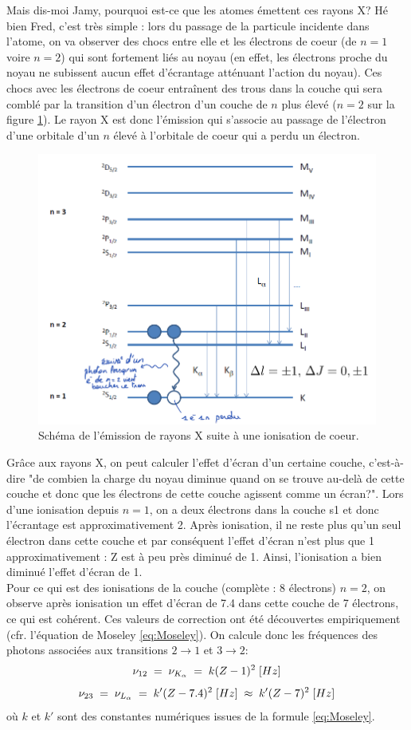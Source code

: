 Mais dis-moi Jamy, pourquoi est-ce que les atomes émettent ces rayons X? Hé bien Fred, c'est très simple : lors du passage de la particule incidente dans l'atome, on va observer des chocs entre elle et les électrons de coeur (de $n=1$ voire $n=2$) qui sont fortement liés au noyau (en effet, les électrons proche du noyau ne subissent aucun effet d'écrantage atténuant l'action du noyau). Ces chocs avec les électrons de coeur entraînent des trous dans la couche qui sera comblé par la transition d'un électron d'un couche de $n$ plus élevé ($n=2$ sur la figure \ref{fig:Rayons X}). Le rayon X est donc l'émission qui s'associe au passage de l'électron d'une orbitale d'un $n$ élevé à l'orbitale de coeur qui a perdu un électron.
\begin{figure}[tph]
    \centering
    \includegraphics[scale=0.8]{Images2/Rayons X.PNG}
    \caption{Schéma de l'émission de rayons X suite à une ionisation de coeur.}
    \label{fig:Rayons X}
\end{figure}
Grâce aux rayons X, on peut calculer l'effet d'écran d'un certaine couche, c'est-à-dire "de combien la charge du noyau diminue quand on se trouve au-delà de cette couche et donc que les électrons de cette couche agissent comme un écran?". Lors d'une ionisation depuis $n=1$, on a deux électrons dans la couche s1 et donc l'écrantage est approximativement 2. Après ionisation, il ne reste plus qu'un seul électron dans cette couche et par conséquent l'effet d'écran n'est plus que 1 approximativement : Z est à peu près diminué de 1. Ainsi, l'ionisation a bien diminué l'effet d'écran de 1.\\
Pour ce qui est des ionisations de la couche (complète : 8 électrons) $n=2$, on observe après ionisation un effet d'écran de 7.4 dans cette couche de 7 électrons, ce qui est cohérent. Ces valeurs de correction ont été découvertes empiriquement (cfr. l'équation de Moseley \ref{eq:Moseley}).
On calcule donc les fréquences des photons associées aux transitions $2\rightarrow1$ et $3\rightarrow2$:
\[
    \nu_{12}
    \; = \; \nu_{K_\alpha}
    \; = \; k (Z - 1)^2 \;[Hz]
\]
\[
    \nu_{23}
    \; = \; \nu_{L_\alpha}
    \; = \; k' (Z - 7.4)^2 \;[Hz]
    \;\approx\;  k' (Z - 7)^2 \;[Hz]
\]
où $k$ et $k'$ sont des constantes numériques issues de la formule \ref{eq:Moseley}.



